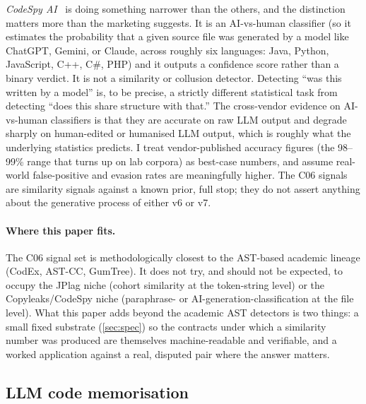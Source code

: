 \documentclass[11pt,letterpaper]{article}
\begin{document}
\emph{CodeSpy AI}~\cite{codespy2026} is doing something narrower than
the others, and the distinction matters more than the marketing
suggests. It is an AI-vs-human classifier (so it estimates the
probability that a given source file was generated by a model like
ChatGPT, Gemini, or Claude, across roughly six languages: Java,
Python, JavaScript, C++, C\#, PHP) and it outputs a confidence
score rather than a binary verdict. It is not a similarity or
collusion detector. Detecting ``was this written by a model'' is, to
be precise, a strictly different statistical task from detecting
``does this share structure with that.'' The cross-vendor evidence
on AI-vs-human classifiers is that they are accurate on raw LLM
output and degrade sharply on human-edited or humanised LLM output,
which is roughly what the underlying statistics predicts. I treat
vendor-published accuracy figures (the 98--99\% range that turns up
on lab corpora) as best-case numbers, and assume real-world
false-positive and evasion rates are meaningfully higher. The C06
signals are similarity signals against a known prior, full stop;
they do not assert anything about the generative process of either
v6 or v7.

\paragraph{Where this paper fits.}
The C06 signal set is methodologically closest to the AST-based
academic lineage (CodEx, AST-CC, GumTree). It does not try, and
should not be expected, to occupy the JPlag niche (cohort similarity
at the token-string level) or the Copyleaks/CodeSpy niche
(paraphrase- or AI-generation-classification at the file level).
What this paper adds beyond the academic AST detectors is two
things: a small fixed substrate (\cref{sec:spec}) so the contracts
under which a similarity number was produced are themselves
machine-readable and verifiable, and a worked application against a
real, disputed pair where the answer matters.

\subsection{LLM code memorisation}
\label{sec:related-memo}
\end{document}
